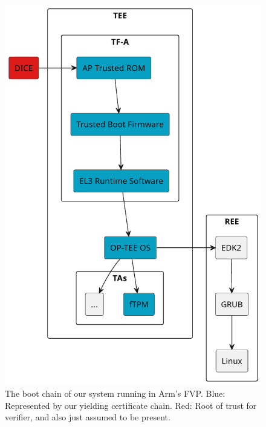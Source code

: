 \begin{figure}[htpb]
  \centering
  \includegraphics[width=0.8\linewidth]{figures/boot-chain.pdf}
  \caption{The boot chain of our system running in Arm's FVP\@. Blue: Represented by our yielding certificate chain. Red: Root of trust for verifier, and also just assumed to be present.}\label{fig:boot_chain}
\end{figure}
